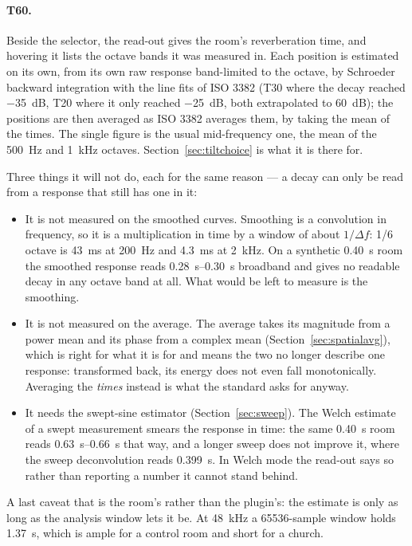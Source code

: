 \paragraph{T60.} Beside the selector, the read-out gives the room's reverberation time, and hovering it lists the octave bands it was measured in. Each position is estimated on its own, from its own raw response band-limited to the octave, by Schroeder backward integration with the line fits of ISO 3382 (T30 where the decay reached \SI{-35}{\dB}, T20 where it only reached \SI{-25}{\dB}, both extrapolated to \SI{60}{\dB}); the positions are then averaged as ISO 3382 averages them, by taking the mean of the times. The single figure is the usual mid-frequency one, the mean of the \SI{500}{\hertz} and \SI{1}{\kilo\hertz} octaves. Section~\ref{sec:tiltchoice} is what it is there for.

Three things it will not do, each for the same reason --- a decay can only be read from a response that still has one in it:

\begin{itemize}[nosep]
  \item It is not measured on the smoothed curves. Smoothing is a convolution in frequency, so it is a multiplication in time by a window of about $1/\Delta f$: 1/6 octave is \SI{43}{\milli\second} at \SI{200}{\hertz} and \SI{4.3}{\milli\second} at \SI{2}{\kilo\hertz}. On a synthetic \SI{0.40}{\second} room the smoothed response reads \SIrange{0.28}{0.30}{\second} broadband and gives no readable decay in any octave band at all. What would be left to measure is the smoothing.
  \item It is not measured on the average. The average takes its magnitude from a power mean and its phase from a complex mean (Section~\ref{sec:spatialavg}), which is right for what it is for and means the two no longer describe one response: transformed back, its energy does not even fall monotonically. Averaging the \emph{times} instead is what the standard asks for anyway.
  \item It needs the swept-sine estimator (Section~\ref{sec:sweep}). The Welch estimate of a swept measurement smears the response in time: the same \SI{0.40}{\second} room reads \SIrange{0.63}{0.66}{\second} that way, and a longer sweep does not improve it, where the sweep deconvolution reads \SI{0.399}{\second}. In Welch mode the read-out says so rather than reporting a number it cannot stand behind.
\end{itemize}

\noindent A last caveat that is the room's rather than the plugin's: the estimate is only as long as the analysis window lets it be. At \SI{48}{\kilo\hertz} a \num{65536}-sample window holds \SI{1.37}{\second}, which is ample for a control room and short for a church.

